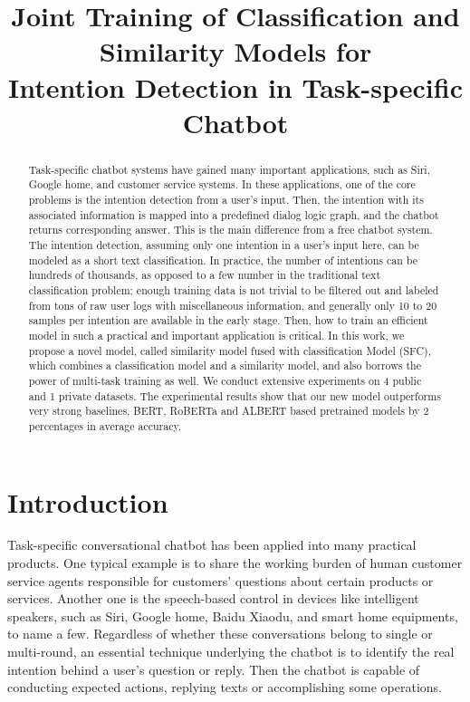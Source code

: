 \documentclass[letterpaper]{article} %
\title{     
  Joint Training of Classification and Similarity Models for \\ 
  Intention Detection in Task-specific Chatbot
}
\begin{document}
  \maketitle
  \linenumbers

  \begin{abstract}
    Task-specific  chatbot systems have gained many important applications, such
    as  Siri,  Google home, and customer service systems. In these applications,
    one  of  the  core  problems is the intention detection from a user's input.
    Then,  the  intention  with  its  associated  information  is  mapped into a
    predefined dialog logic graph, and the chatbot returns corresponding answer.
    This  is  the  main  difference  from  a  free chatbot system. The intention
    detection,  assuming  only  one  intention  in  a  user's input here, can be
    modeled  as  a  short  text  classification.  In  practice,  the  number  of
    intentions  can  be hundreds of thousands, as opposed to a few number in the
    traditional text classification problem; enough training data is not trivial
    to be filtered out and labeled from tons of raw user logs with miscellaneous
    information, and generally only 10 to 20 samples per intention are available
    in  the  early  stage.  Then,  how  to  train  an  efficient model in such a
    practical  and important application is critical. In this work, we propose a
    novel  model, called similarity model fused with classification Model (SFC),
    which  combines  a  classification  model  and  a similarity model, and also
    borrows  the  power  of  multi-task  training  as well. We conduct extensive
    experiments  on  4  public  and 1 private datasets. The experimental results
    show that our new model outperforms very strong baselines, BERT, RoBERTa and
    ALBERT based pretrained models by 2 percentages in average accuracy.

  \end{abstract}

  \section{Introduction}
  \label{sec:intro}

  Task-specific  conversational  chatbot  \cite{wen2016network}  has been applied
  into  many practical products. One typical example is to share the working burden of
  human  customer  service  agents  responsible  for  customers' questions about
  certain  products  or services. Another one is the speech-based control in
  devices  like  intelligent  speakers, such as Siri, Google home, Baidu Xiaodu,
  and smart home equipments, to name a few. Regardless of whether these conversations belong to
  single or  multi-round, an essential technique underlying the chatbot is to
  identify  the  real  intention  behind  a  user's  question or reply. Then the
  chatbot  is capable of conducting expected actions, replying texts or accomplishing some
  operations.
\end{document}
